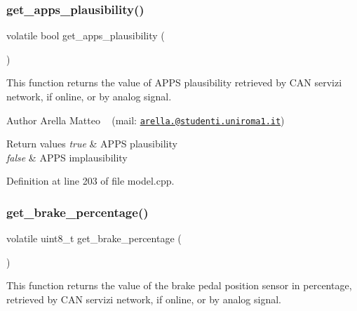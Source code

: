 \subsubsection{\texorpdfstring{get\+\_\+apps\+\_\+plausibility()}{get\_apps\_plausibility()}}
{\footnotesize\ttfamily volatile bool get\+\_\+apps\+\_\+plausibility (\begin{DoxyParamCaption}{ }\end{DoxyParamCaption})}



This function returns the value of A\+P\+PS plausibility retrieved by C\+AN servizi network, if online, or by analog signal. 

\begin{DoxyAuthor}{Author}
Arella Matteo ~\newline
 (mail\+: \href{mailto:arella.1646983@studenti.uniroma1.it}{\tt arella.@studenti.\+uniroma1.\+it})
\end{DoxyAuthor}

\begin{DoxyRetVals}{Return values}
{\em true} & A\+P\+PS plausibility \\
\hline
{\em false} & A\+P\+PS implausibility \\
\hline
\end{DoxyRetVals}


Definition at line 203 of file model.\+cpp.

\mbox{\label{group___board__model__group_ga6db41e7368919bc4dfafaf4e400ae1a9}} 
\subsubsection{\texorpdfstring{get\+\_\+brake\+\_\+percentage()}{get\_brake\_percentage()}}
{\footnotesize\ttfamily volatile uint8\+\_\+t get\+\_\+brake\+\_\+percentage (\begin{DoxyParamCaption}{ }\end{DoxyParamCaption})}



This function returns the value of the brake pedal position sensor in percentage, retrieved by C\+AN servizi network, if online, or by analog signal. 

